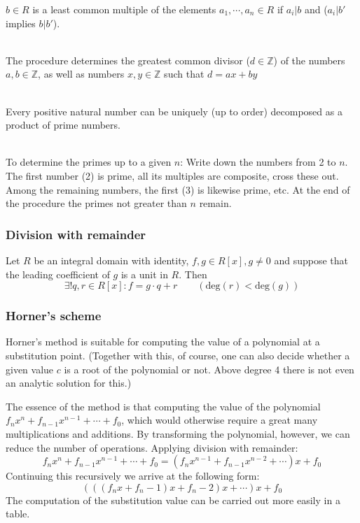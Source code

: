 \documentclass[margin=0px]{article}
\newcommand{\Z}{\mathbb{Z}}
\begin{document}
\begin{description}
        $b\in R$ is a least common multiple of the elements $a_1,\cdots,a_n \in R$ if $a_i|b$ and ($a_i|b'$ implies $b|b'$).
    \item[Extended Euclidean algorithm] \hfill \\
        The procedure determines the greatest common divisor ($d\in\Z$) of the numbers $a,b \in \Z$, as well as numbers $x,y \in\Z$ such that $d = ax+by$
    \item[Fundamental theorem of arithmetic] \hfill \\
        Every positive natural number can be uniquely (up to order) decomposed as a product of prime numbers.
    \item[Sieve of Eratosthenes] \hfill \\
        To determine the primes up to a given $n$:
        Write down the numbers from 2 to $n$. The first number (2) is prime, all its multiples are composite, cross these out. Among the remaining numbers, the first (3) is likewise prime, etc. At the end of the procedure the primes not greater than $n$ remain.
\end{description}
\subsubsection{Division with remainder}
Let $R$ be an integral domain with identity, $f,g\in R[x], g \neq 0$ and suppose that the leading coefficient of $g$ is a unit in $R$. Then
\[ \exists! q,r \in R[x] : f = g\cdot q+r \qquad (\text{deg}(r) < \text{deg}(g) )\]

\subsubsection{Horner's scheme}
Horner's method is suitable for computing the value of a polynomial at a substitution point. (Together with this, of course, one can also decide whether a given value $c$ is a root of the polynomial or not. Above degree 4 there is not even an analytic solution for this.)

The essence of the method is that computing the value of the polynomial $f_nx^n+f_{n-1}x^{n-1}+\cdots+f_0$, which would otherwise require a great many multiplications and additions. By transforming the polynomial, however, we can reduce the number of operations. Applying division with remainder:
\[f_nx^n+f_{n-1}x^{n-1}+\cdots+f_0 = (f_nx^{n-1}+f_{n-1}x^{n-2}+\cdots)x+f_0\]
Continuing this recursively we arrive at the following form:
\[(((f_nx+f_n-1)x+f_n-2)x+\cdots)x+f_0\]
The computation of the substitution value can be carried out more easily in a table.
\end{document}
